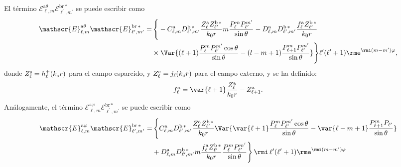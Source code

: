 El término $\mathscr{E}_{\ell, m}^{\text{a}\theta}\mathscr{E}_{\ell^{\prime}, m^{\prime}}^{\text{br}\,*}$ se puede escribir como
\begin{align}
\mathscr{E}_{\ell, m}^{\text{a}\theta}\mathscr{E}_{\ell^{\prime}, m^{\prime}}^{\text{br}\,*}=& \, \Bigg\{-C_{\ell,m}^{\rm a}D_{\ell^{\prime}, m^{\prime}}^{\rm b \, *}\frac{Z_{\ell}^{\rm a}Z_{\ell^{\prime}}^{\rm b\, *}}{k_0 r} m \frac{P_{\ell}^{m}P_{\ell^{\prime}}^{m^{\prime}}}{\sin\theta}-D_{\ell, m}^{\rm a}D_{\ell^{\prime}, m^{\prime}}^{\rm b \, *} \frac{f_{\ell}^{\rm a}Z_{\ell^{\prime}}^{\rm b \, *}}{k_0 r}\nonumber\\
& \times \Var{(\ell+1) \frac{P_{\ell}^m P_{\ell^{\prime}}^{m^{\prime}}\cos\theta}{\sin\theta}-(l-m+1)\frac{P_{\ell+1}^{m}P_{\ell^{\prime}}^{m^{\prime}}}{\sin\theta}}\Bigg\}\ell^{\prime}(\ell^{\prime}+1)  \rme^{\rmi (m-m^{\prime})\varphi },
\end{align}
donde $Z_{\ell}^{\rm s}=h_{\ell}^{+}(k_o r)$ para el campo esparcido, y $Z_{\ell}^{\rm e}=j_{\ell}(k_o r)$ para el campo externo, y se ha definido:
\begin{equation}
f_{\ell}^{\rm a}= \var{\ell + 1} \frac{Z_{\ell}^{\rm a}}{k_0 r}-Z_{\ell+1}^{\rm a}.
\end{equation}
Análogamente, el término $\mathscr{E}_{\ell, m}^{\text{a}\varphi}\mathscr{E}_{\ell^{\prime}, m^{\prime}}^{\text{br}\,*}$ se puede escribir como
\begin{align}
\mathscr{E}_{\ell, m}^{\text{a}\varphi}\mathscr{E}_{\ell^{\prime}, m^{\prime}}^{\text{br}\,*} =& \, \Bigg\{ C_{\ell, m}^{\rm a} D_{\ell^{\prime}, m^{\prime}}^{\rm b \, *} \frac{Z_{\ell}^{\rm a} Z_{\ell^{\prime}}^{\rm b \, *}}{k_0 r} \Var{\var{\ell +1} \frac{P_{\ell}^{m} P_{\ell^{\prime}}^{m^{\prime}}\cos\theta}{\sin\theta} -\var{\ell - m +1}\frac{P_{\ell+1}^m P_{\ell^{\prime}}}{\sin\theta} }\nonumber\\
& + D_{\ell, m}^{\rm a} D_{\ell^{\prime}, m^{\prime}}^{\rm b \, *} m \frac{f_{\ell}^{\rm a} Z_{\ell^{\prime}}^{\rm b\, *}}{k_0 r} \frac{P_{\ell}^{m} P_{\ell^{\prime}}^{m^{\prime}}}{\sin\theta} \Bigg\} \, \rmi \, \ell^{\prime}(\ell^{\prime}+1)  \rme^{\rmi (m-m^{\prime})\varphi }
\end{align}

